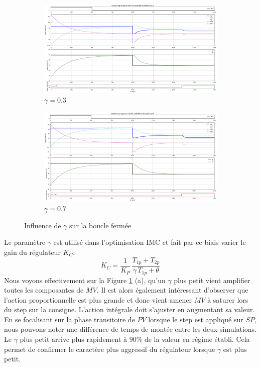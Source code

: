 \begin{figure}[H]
    \centering
    \begin{subfigure}[b]{0.48\textwidth}
        \includegraphics[width=\textwidth]{../Plots/Simulation_scenario_7_gamma=0.3.png}
        \caption{$\gamma = 0.3$}
    \end{subfigure}
    \begin{subfigure}[b]{0.48\textwidth}
        \includegraphics[width=\textwidth]{../Plots/Simulation_scenario_7_gamma=0.7.png}
        \caption{$\gamma = 0.7$}
    \end{subfigure}
    \caption{Influence de $\gamma$ sur la boucle fermée}
    \label{fig:Simulation_gamma_influence}
\end{figure}
Le paramètre $\gamma$ est utilisé dans l'optimisation IMC et fait par ce biais varier le gain du régulateur $K_C$.
\begin{equation*}
    K_C = \frac{1}{K_P} \, \frac{T_{1p} + T_{2p}}{\gamma \, T_{1p} + \theta}
\end{equation*}
Nous voyons effectivement sur la Figure \ref{fig:Simulation_gamma_influence} (a), qu'un $\gamma$ plus petit vient amplifier toutes les composantes de $MV$.
Il est alors également intéressant d'observer que l'action proportionnelle est plus grande et donc vient amener $MV$ à saturer lors du step sur la consigne.
L'action intégrale doit s'ajuster en augmentant sa valeur.\\
En se focalisant sur la phase transitoire de $PV$ lorsque le step est appliqué sur $SP$, nous pouvons noter une différence de temps de montée entre les deux simulations.
Le $\gamma$ plus petit arrive plus rapidement à 90\% de la valeur en régime établi.
Cela permet de confirmer le caractère plus aggressif du régulateur lorsque $\gamma$ est plus petit.
